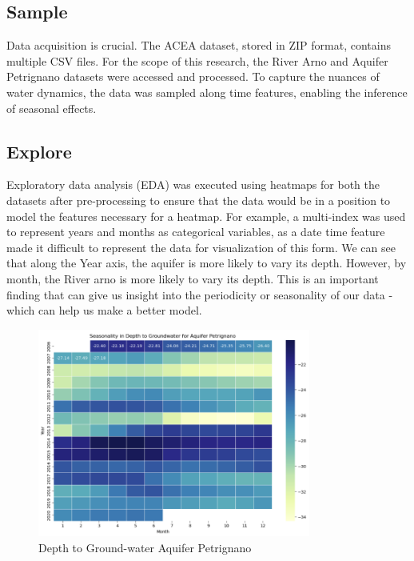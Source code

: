 \documentclass{article}
\begin{document}
\subsection{Sample}
Data acquisition is crucial. The ACEA dataset, stored in ZIP format, contains multiple CSV files. For the scope of this research, the River Arno and Aquifer Petrignano datasets were accessed and processed. To capture the nuances of water dynamics, the data was sampled along time features, enabling the inference of seasonal effects.

\subsection{Explore}
Exploratory data analysis (EDA) was executed using heatmaps for both the datasets after pre-processing to ensure that the data would be in a position to model the features necessary for a heatmap. For example, a multi-index was used to represent years and months as categorical variables, as a date time feature made it difficult to represent the data for visualization of this form. We can see that along the Year axis, the aquifer is more likely to vary its depth. However, by month, the River arno is more likely to vary its depth. This is an important finding that can give us insight into the periodicity or seasonality of our data - which can help us make a better model.

\begin{figure}[h]
\centering
\includegraphics[width=0.8\textwidth]{petrignano_depth.png}
\caption{Depth to Ground-water Aquifer Petrignano}
\end{figure}
\end{document}
